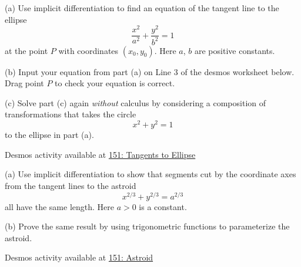 \documentclass{ximera}
\begin{document}
\begin{question}  \label{Q:4bbfdellk}
(a) Use implicit differentiation to find an equation of the tangent line to the ellipse 
\[
   \frac{x^2}{a^2} + \frac{y^2}{b^2} = 1
\]
at the point $P$ with coordinates $(x_0, y_0)$. Here $a$, $b$ are positive constants.

(b) Input your equation from part (a) on Line 3 of the desmos worksheet below. Drag point $P$ to check your equation is correct.

(c) Solve part (c) again \emph{without} calculus by considering a composition of transformations that takes the circle
\[
       x^2 + y^2 = 1
\]
to the ellipse in part (a).

\begin{onlineOnly}
    \begin{center}
\end{center}
\end{onlineOnly}

Desmos activity available at \href{https://www.desmos.com/calculator/t1e9v7ncpv}{151: Tangents to Ellipse}

\end{question}





\begin{question}  \label{Q:LLKKKMM}
(a) Use implicit differentiation to show that segments cut by the coordinate axes from the tangent lines to the astroid
\[
   x^{2/3} + y^{2/3} = a^{2/3}
\]
all have the same length. Here $a>0$ is a constant.

(b) Prove the same result by using trigonometric functions to parameterize the astroid.

\begin{onlineOnly}
    \begin{center}
\end{center}
\end{onlineOnly}

Desmos activity available at \href{https://www.desmos.com/calculator/vrythrvjuc}{151: Astroid}


\end{question}
\end{document}
